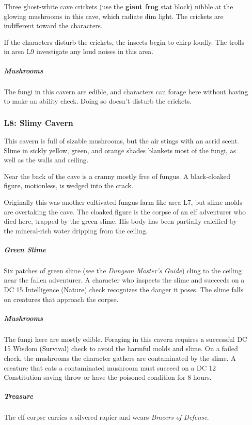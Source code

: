 \documentclass[10pt,a4paper,twoside,bg=print,twocolumn,openany,nodeprecatedcode]{dndbook}
\begin{document}
Three ghost-white cave crickets (use the \textbf{giant frog} stat block) nibble at the glowing mushrooms in this cave, which radiate dim light. The crickets are indifferent toward the characters.

If the characters disturb the crickets, the insects begin to chirp loudly. The trolls in area L9 investigate any loud noises in this area.

\subparagraph{Mushrooms}
The fungi in this cavern are edible, and characters can forage here without having to make an ability check. Doing so doesn't disturb the crickets.

\subsubsection{L8: Slimy Cavern}
\begin{DndReadAloud}{}
This cavern is full of sizable mushrooms, but the air stings with an acrid scent. Slime in sickly yellow, green, and orange shades blankets most of the fungi, as well as the walls and ceiling.

Near the back of the cave is a cranny mostly free of fungus. A black-cloaked figure, motionless, is wedged into the crack.

\end{DndReadAloud}

Originally this was another cultivated fungus farm like area L7, but slime molds are overtaking the cave. The cloaked figure is the corpse of an elf adventurer who died here, trapped by the green slime. His body has been partially calcified by the mineral-rich water dripping from the ceiling.

\subparagraph{Green Slime}
Six patches of green slime (see the \textit{Dungeon Master's Guide}) cling to the ceiling near the fallen adventurer. A character who inspects the slime and succeeds on a DC 15 Intelligence (Nature) check recognizes the danger it poses. The slime falls on creatures that approach the corpse.

\subparagraph{Mushrooms}
The fungi here are mostly edible. Foraging in this cavern requires a successful DC 15 Wisdom (Survival) check to avoid the harmful molds and slime. On a failed check, the mushrooms the character gathers are contaminated by the slime. A creature that eats a contaminated mushroom must succeed on a DC 12 Constitution saving throw or have the poisoned condition for 8 hours.

\subparagraph{Treasure}
The elf corpse carries a silvered rapier and wears \textit{Bracers of Defense}.
\end{document}
